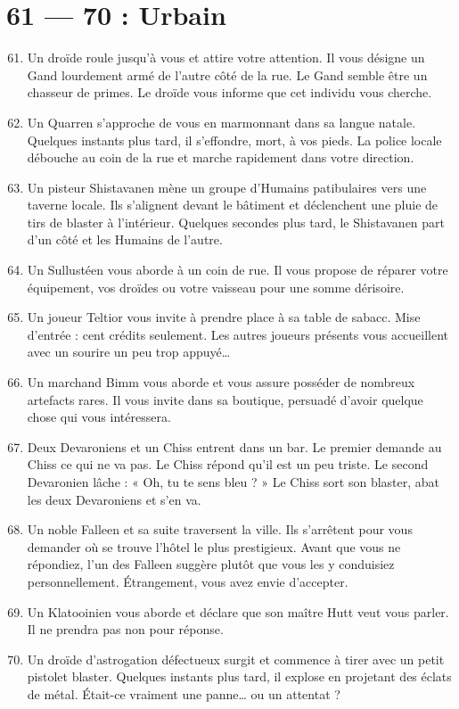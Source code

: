 \documentclass{article}
\begin{document}
\section*{61 --- 70 : Urbain}
\begin{enumerate}
	\setcounter{enumi}{60}

	\item Un droïde roule jusqu’à vous et attire votre attention. Il vous désigne un Gand lourdement armé de l’autre côté de la rue. Le Gand semble être un chasseur de primes. Le droïde vous informe que cet individu vous cherche.
	\item Un Quarren s’approche de vous en marmonnant dans sa langue natale. Quelques instants plus tard, il s’effondre, mort, à vos pieds. La police locale débouche au coin de la rue et marche rapidement dans votre direction.
	\item Un pisteur Shistavanen mène un groupe d’Humains patibulaires vers une taverne locale. Ils s’alignent devant le bâtiment et déclenchent une pluie de tirs de blaster à l’intérieur. Quelques secondes plus tard, le Shistavanen part d’un côté et les Humains de l’autre.
	\item Un Sullustéen vous aborde à un coin de rue. Il vous propose de réparer votre équipement, vos droïdes ou votre vaisseau pour une somme dérisoire.
	\item Un joueur Teltior vous invite à prendre place à sa table de sabacc. Mise d’entrée : cent crédits seulement. Les autres joueurs présents vous accueillent avec un sourire un peu trop appuyé…
	\item Un marchand Bimm vous aborde et vous assure posséder de nombreux artefacts rares. Il vous invite dans sa boutique, persuadé d’avoir quelque chose qui vous intéressera.
	\item Deux Devaroniens et un Chiss entrent dans un bar. Le premier demande au Chiss ce qui ne va pas. Le Chiss répond qu’il est un peu triste. Le second Devaronien lâche : « Oh, tu te sens bleu ? » Le Chiss sort son blaster, abat les deux Devaroniens et s’en va.
	\item Un noble Falleen et sa suite traversent la ville. Ils s’arrêtent pour vous demander où se trouve l’hôtel le plus prestigieux. Avant que vous ne répondiez, l’un des Falleen suggère plutôt que vous les y conduisiez personnellement. Étrangement, vous avez envie d’accepter.
	\item Un Klatooinien vous aborde et déclare que son maître Hutt veut vous parler. Il ne prendra pas non pour réponse.
	\item Un droïde d’astrogation défectueux surgit et commence à tirer avec un petit pistolet blaster. Quelques instants plus tard, il explose en projetant des éclats de métal. Était-ce vraiment une panne… ou un attentat ?
\end{enumerate}
\end{document}
